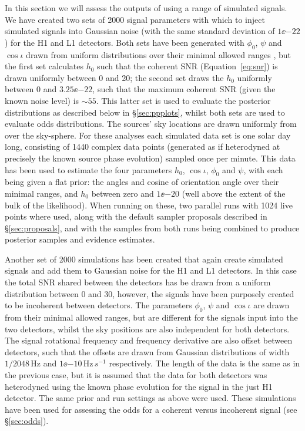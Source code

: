 In this section we will assess the outputs of \lppen using a range of simulated signals. We have created two sets of 2000 signal parameters with which to
inject simulated signals into Gaussian noise (with the same standard deviation of $1\ee{-22}$) for the H1 and L1 detectors. Both sets have been generated
with $\phi_0$, $\psi$ and $\cos{\iota}$ drawn from uniform distributions over their minimal allowed ranges \citep[Table~1 of][]{2015MNRAS.453.4399P},
but the first set
calculates $h_0$ such that the coherent SNR (Equation~\ref{eq:snr}) is drawn uniformly between 0 and 20; the second set draws the $h_0$ uniformly between
0 and $3.25\ee{-22}$, such that the maximum coherent SNR (given the known noise level) is $\sim 55$. This latter set is used to evaluate the posterior
distributions as described below in \S\ref{sec:ppplots}, whilst both sets are used to evaluate odds distributions. The sources' sky locations are drawn
uniformly from over the sky-sphere. For these analyses each
simulated data set is one solar day long, consisting of 1440 complex data points (generated as if heterodyned at precisely the known source phase evolution)
sampled once per minute. This data has been used to estimate the four parameters $h_0$, $\cos{\iota}$, $\phi_0$ and $\psi$, with each being given
a flat prior: the angles and cosine of orientation angle over their minimal ranges, and $h_0$ between zero and $1\ee{-20}$ (well above the extent of the
bulk of the likelihood). When running \lppen on these, two parallel runs with 1024 live points where used, along with the default sampler proposals described
in \S\ref{sec:proposals}, and with the samples from both runs being combined to produce posterior samples and evidence estimates.

Another set of 2000 simulations has been created that again create simulated signals and add them to Gaussian noise for the H1 and L1 detectors. In this
case the total SNR shared between the detectors has be drawn from a uniform distribution between 0 and 30, however, the signals have been purposely created
to be incoherent between detectors. The parameters $\phi_0$, $\psi$ and $\cos{\iota}$ are drawn from their minimal allowed ranges, but are different for
the signals input into the two detectors, whilst the sky positions are also independent for both detectors. The signal rotational frequency and frequency
derivative are also offset between detectors, such that the offsets are drawn from Gaussian distributions of width $1/2048$\,Hz and $1\ee{-10}$\,Hz$\,s^{-1}$
respectively. The length of the data is the same as in the previous case, but it is assumed that the data for both detectors was heterodyned using the
known phase evolution for the signal in the just H1 detector. The same prior and run settings as above were used. These simulations have been used for
assessing the odds for a coherent versus incoherent signal (see \S\ref{sec:odds}).

